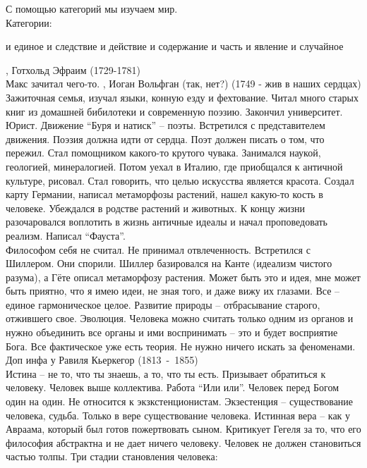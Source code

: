 \documentclass[a4paper,12pt]{report} %
\begin{document}
\begin{itemize}
  С помощью категорий мы изучаем мир.\\
  Категории:
  \begin{enumerate}
   и единое
   и следствие
   и действие
   и содержание
   и часть
   и явление
   и случайное
  \end{enumerate}
, Готхольд Эфраим (1729-1781)\\
Макс зачитал чего-то.
, Иоган Вольфган (так, нет?) (1749 - жив в наших сердцах)\\
Зажиточная семья, изучал языки, конную езду и фехтование. Читал много
старых книг из домашней бибилотеки и современную поэзию. Закончил
университет. Юрист. Движение ``Буря и натиск'' -- поэты. Встретился с
представителем движения. Поэзия должна идти от сердца. Поэт должен
писать о том, что пережил. Стал помощником какого-то крутого
чувака. Занимался наукой, геологией, минералогией. Потом уехал в
Италию, где приобщался к античной культуре, рисовал. Стал говорить,
что целью искусства является красота. Создал карту Германии, написал
метаморфозы растений, нашел какую-то кость в человеке. Убеждался в
родстве растений и животных. К концу жизни разочаровался воплотить в
жизнь античные идеалы и начал проповедовать реализм. Написал
``Фауста''.\\
Философом себя не считал. Не принимал отвлеченность. Встретился с
Шиллером. Они спорили. Шиллер базировался на Канте (идеализм чистого
разума), а Гёте описал метаморфозу растения. Может быть это и идея,
мне может быть приятно, что я имею идеи, не зная того, и даже вижу их
глазами. Все -- единое гармоническое целое. Развитие природы --
отбрасывание старого, отжившего свое. Эволюция. Человека можно считать
только одним из органов и нужно объединить все органы и ими
воспринимать -- это и будет восприятие Бога. Все фактическое уже есть
теория. Не нужно ничего искать за феноменами.
\\
Доп инфа у Равиля
 Кьеркегор (1813~-~1855)\\
Истина -- не то, что ты знаешь, а то, что ты есть. Призывает
обратиться к человеку. Человек выше коллектива. Работа ``Или
или''. Человек перед Богом один на один. Не относится к
экзкстенционистам. Экзестенция -- существование человека,
судьба. Только в вере существование человека. Истинная вера -- как у
Авраама, который был готов пожертвовать сыном. Критикует Гегеля за то,
что его философия абстрактна и не дает ничего человеку. Человек не
должен становиться частью толпы. Три стадии становления человека:

\end{itemize}
\end{document}
